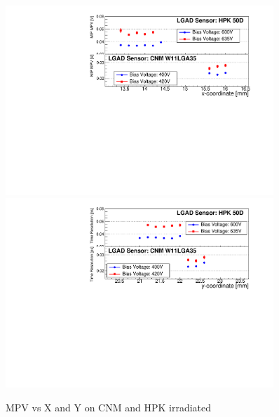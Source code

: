 \documentclass[preprint,1p]{elsarticle}
\begin{document}
\begin{figure}[htbp] 
\centering
\includegraphics[width=0.90\textwidth]{figs/USCSBoard_HPK50DIrradiated-CNMW11LGA35_Run936-961/IrradiatedSensorStudy_MPV_vs_X.pdf} 
\includegraphics[width=0.90\textwidth]{figs/USCSBoard_HPK50DIrradiated-CNMW11LGA35_Run936-961/IrradiatedSensorStudy_MPV_vs_Y.pdf} 
\caption{MPV vs X and Y on CNM and HPK irradiated} 
\label{fig:Sensors} 
\end{figure}
\end{document}
